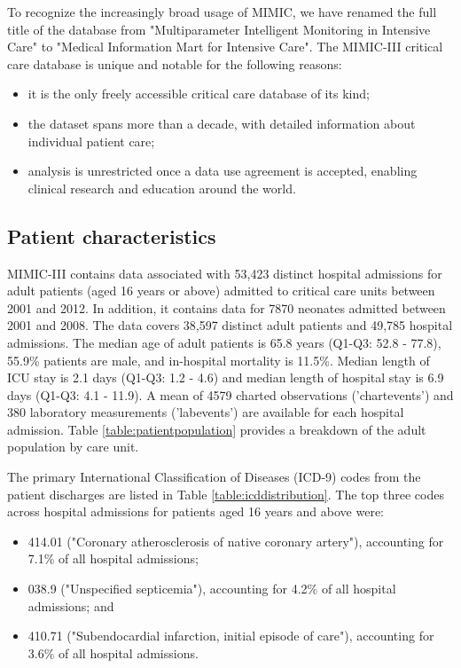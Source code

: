 \documentclass[english]{article}
\begin{document}
% 

To recognize the increasingly broad usage of MIMIC, we have renamed the full title of the database from "Multiparameter Intelligent Monitoring in Intensive Care" to "Medical Information Mart for Intensive Care". The MIMIC-III critical care database is unique and notable for the following reasons:
\begin{itemize}
  \item it is the only freely accessible critical care database of its kind;
  \item the dataset spans more than a decade, with detailed information about individual patient care;
  \item analysis is unrestricted once a data use agreement is accepted, enabling clinical research and education around the world.
\end{itemize}

\subsection*{Patient characteristics}

MIMIC-III contains data associated with 53,423 distinct hospital admissions for adult patients (aged 16 years or above) admitted to critical care units between 2001 and 2012. In addition, it contains data for 7870 neonates admitted between 2001 and 2008. The data covers 38,597 distinct adult patients and 49,785 hospital admissions. The median age of adult patients is 65.8 years (Q1-Q3: 52.8 - 77.8), 55.9\% patients are male, and in-hospital mortality is 11.5\%. Median length of ICU stay is 2.1 days (Q1-Q3: 1.2 - 4.6) and median length of hospital stay is 6.9 days (Q1-Q3: 4.1 - 11.9). A mean of 4579 charted observations ('chartevents') and 380 laboratory measurements ('labevents') are available for each hospital admission. Table \ref{table:patientpopulation} provides a breakdown of the adult population by care unit.

The primary International Classification of Diseases (ICD-9) codes from the patient discharges are listed in Table \ref{table:icddistribution}. The top three codes across hospital admissions for patients aged 16 years and above were:
\begin{itemize}
\item 414.01 ("Coronary atherosclerosis of native coronary artery"), accounting for 7.1\% of all hospital admissions;
\item 038.9 ("Unspecified septicemia"), accounting for 4.2\% of all hospital admissions; and
\item 410.71 ("Subendocardial infarction, initial episode of care"), accounting for 3.6\% of all hospital admissions.
\end{itemize}
\end{document}
